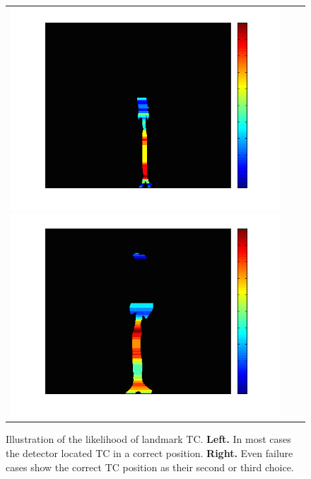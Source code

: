 \begin{figure}[tb]
  \begin{center}
    \begin{tabular}{ccc}
    \includegraphics[width=\figwidth] {fig/CRL02_TracheaCarina_left.png}
    \includegraphics[width=\figwidth] {fig/CRL04_TracheaCarina_left.png}
    \end{tabular}
    \caption{ \label{fig:landmark_detection} Illustration of the likelihood of landmark TC. {\bf Left.} In most cases the detector located TC in a correct position. {\bf Right.} Even failure cases show the correct TC position as their second or third choice.
    }
  \end{center}
\end{figure}


